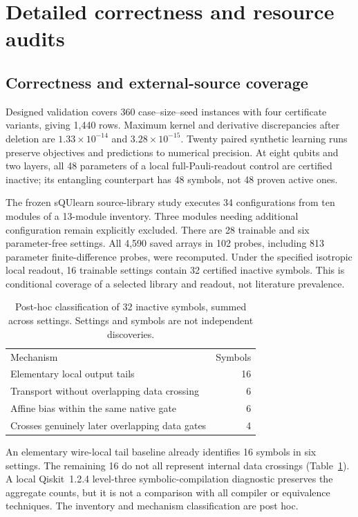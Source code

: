 \section{Detailed correctness and resource audits}
\label{app:resource_details}
\subsection{Correctness and external-source coverage}
Designed validation covers 360 case--size--seed instances with four
certificate variants, giving 1,440 rows. Maximum kernel and derivative
discrepancies after deletion are $1.33\times10^{-14}$ and
$3.28\times10^{-15}$. Twenty paired synthetic learning runs preserve
objectives and predictions to numerical precision. At eight qubits
and two layers, all 48 parameters of a local full-Pauli-readout control
are certified inactive; its entangling counterpart has 48 \unknown{}
symbols, not 48 proven active ones.

The frozen sQUlearn source-library study \cite{squlearn} executes 34 configurations from ten modules
of a 13-module inventory. Three modules needing additional
configuration remain explicitly excluded. There are 28 trainable and
six parameter-free settings. All 4,590 saved arrays in 102 probes,
including 813 parameter finite-difference probes, were recomputed.
Under the specified isotropic local readout, 16 trainable settings
contain 32 certified inactive symbols. This is conditional coverage
of a selected library and readout, not literature prevalence.

\begin{table}[t]
\caption{Post-hoc classification of 32 inactive symbols, summed across
settings. Settings and symbols are not independent discoveries.}
\label{tab:mechanisms}
\begin{tabular}{lr}
\toprule
Mechanism & Symbols\\
Elementary local output tails & 16\\
Transport without overlapping data crossing & 6\\
Affine bias within the same native gate & 6\\
Crosses genuinely later overlapping data gates & 4\\
\bottomrule
\end{tabular}
\end{table}

An elementary wire-local tail baseline already identifies 16 symbols
in six settings. The remaining 16 do not all represent internal data
crossings (Table~\ref{tab:mechanisms}). A local Qiskit~1.2.4 level-three
symbolic-compilation diagnostic preserves the aggregate counts, but
it is not a comparison with all compiler or equivalence techniques.
The inventory and mechanism classification are post hoc.

